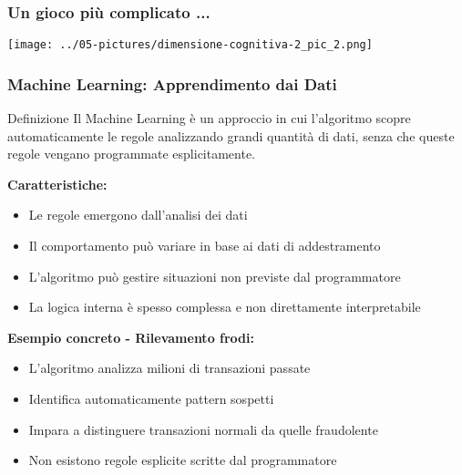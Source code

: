 \documentclass[aspectratio=169]{beamer}
\begin{document}
%
\begin{frame}
\frametitle{Un gioco più complicato ...}
\begin{center}
\texttt{[image: ../05-pictures/dimensione-cognitiva-2\_pic\_2.png]} 
\end{center}
\end{frame}
%
%
\begin{frame}
\frametitle{Machine Learning: Apprendimento dai Dati}
\begin{block}{Definizione}
Il Machine Learning è un approccio in cui l'algoritmo scopre automaticamente le regole analizzando grandi quantità di dati, senza che queste regole vengano programmate esplicitamente.
\end{block}

\textbf{Caratteristiche:}
\begin{itemize}
\item Le regole emergono dall'analisi dei dati
\item Il comportamento può variare in base ai dati di addestramento
\item L'algoritmo può gestire situazioni non previste dal programmatore
\item La logica interna è spesso complessa e non direttamente interpretabile
\end{itemize}

\textbf{Esempio concreto - Rilevamento frodi:}
\begin{itemize}
\item L'algoritmo analizza milioni di transazioni passate
\item Identifica automaticamente pattern sospetti
\item Impara a distinguere transazioni normali da quelle fraudolente
\item Non esistono regole esplicite scritte dal programmatore
\end{itemize}
\end{frame}
%
%
\end{document}
